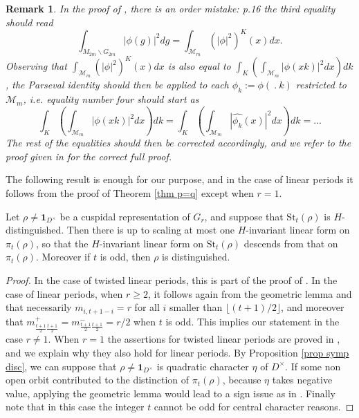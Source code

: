 \documentclass[11pt,letterpaper]{amsart}
\newcommand{\CM}{{\mathcal {M}}} \newcommand{\CN}{{\mathcal {N}}}\newcommand{\CO}{{\mathcal {O}}}\newcommand{\CP}{{\mathcal {P}}}
\newcommand{\triv}{{\mathbf{1}}}
\def\St{\mathrm{St}}
\theoremstyle{plain}
\newtheorem {rem}[thm]{Remark} \newtheorem{ex}[thm]{Example}
\numberwithin{equation}{section}
\begin{document}
\begin{rem}
In the proof of \cite[Theorem 5.1]{MatJNT}, there is an order mistake: p.16 the 
third equality should read \[\int_{M_{2m}\backslash G_{2m}}|\phi(g)|^2dg=\int_{\CM_m}(|\phi|^2)^K(x) dx.\] Observing that 
$\int_{\CM_m}(|\phi|^2)^K(x) dx$ is also equal to $\int_K(\int_{\CM_m}|\phi(xk)|^2 dx)dk$, the Parseval identity should then be applied to each $\phi_k:=\phi( \ . \ k)$ restricted to $\CM_m$, i.e. equality number four should start as 
\[\int_K(\int_{\CM_m}|\phi(xk)|^2 dx)dk=\int_K(\int_{\CM_m}|\widehat{\phi_k}(x)|^2 dx)dk=...\] The rest of the equalities should then be corrected accordingly, and we refer to the proof given in \cite[Lemme 5.7]{Duhamel} for the correct full proof.
\end{rem}


The following result is enough for our purpose, and in the case of linear periods it follows from the proof of Theorem \ref{thm p=q} except when $r=1$. 

\begin{prop}\label{prop st implies cusp}
Let $\rho\neq \triv_{D^\times}$ be a cuspidal representation of $G_r$, and suppose that $\St_t(\rho)$ is $H$-distinguished. Then there is up to scaling at most one $H$-invariant linear form on 
$\pi_t(\rho)$, so that the $H$-invariant linear form on $\St_t(\rho)$ descends from that on $\pi_t(\rho)$. Moreover if $t$ is odd, then $\rho$ is distinguished. 
\end{prop} 
\begin{proof}
In the case of twisted linear periods, this is part of the proof of \cite[Proposition 5.6]{BM}. In the case of linear periods, 
 when $r\geq 2$, it follows again from the geometric lemma \cite[Corollary 5.2]{OJNT} and \cite[Section 3]{MatCRELLE} that necessarily $m_{i,t+1-i}=r$ for all $i$ smaller than $\lfloor (t+1)/2 \rfloor$, and moreover that $m_{\frac{t+1}{2} \frac{t+1}{2}}^+=m_{\frac{t+1}{2} \frac{t+1}{2}}^-=r/2$ when $t$ is odd. This implies our statement in the case $r\neq 1$. When $r=1$ the assertions for twisted linear periods are proved in \cite{Ch}, and we explain why they also hold for linear periods. By Proposition \ref{prop symp disc}, we can suppose that $\rho\neq \triv_{D^\times}$ is quadratic character $\eta$ of $D^\times$. If some non open orbit contributed to the distinction of $\pi_t(\rho)$, because $\eta$ takes negative value, applying the geometric lemma would lead to a sign issue as in \cite[Proof of Proposition 3.6]{Matringe-Inner+GLn+Steinberg}. Finally note that in this case the integer $t$ cannot be odd for central character reasons.
\end{proof}
\end{document}

